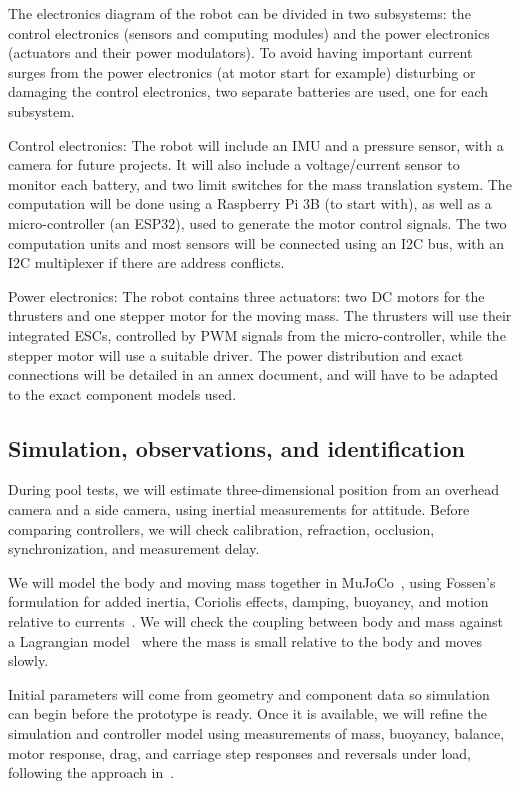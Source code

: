 \documentclass[letterpaper, 10 pt, conference]{ieeeconf}
\begin{document}
The electronics diagram of the robot can be divided in two subsystems: the control electronics (sensors and computing modules) and the power electronics (actuators and their power modulators). To avoid having important current surges from the power electronics (at motor start for example) disturbing or damaging the control electronics, two separate batteries are used, one for each subsystem.

Control electronics: The robot will include an IMU and a pressure sensor, with a camera for future projects. It will also include a voltage/current sensor to monitor each battery, and two limit switches for the mass translation system. The computation will be done using a Raspberry Pi 3B (to start with), as well as a micro-controller (an ESP32), used to generate the motor control signals. The two computation units and most sensors will be connected using an I2C bus, with an I2C multiplexer if there are address conflicts.

Power electronics: The robot contains three actuators: two DC motors for the thrusters and one stepper motor for the moving mass. The thrusters will use their integrated ESCs, controlled by PWM signals from the micro-controller, while the stepper motor will use a suitable driver.
The power distribution and exact connections will be detailed in an annex document, and will have to be adapted to the exact component models used.

\subsection{Simulation, observations, and identification}

During pool tests, we will estimate three-dimensional position from an overhead camera and a side camera, using inertial measurements for attitude. Before comparing controllers, we will check calibration, refraction, occlusion, synchronization, and measurement delay.

We will model the body and moving mass together in MuJoCo~\cite{todorov}, using Fossen's formulation for added inertia, Coriolis effects, damping, buoyancy, and motion relative to currents~\cite{fossen}. We will check the coupling between body and mass against a Lagrangian model~\cite{rambech} where the mass is small relative to the body and moves slowly.

Initial parameters will come from geometry and component data so simulation can begin before the prototype is ready. Once it is available, we will refine the simulation and controller model using measurements of mass, buoyancy, balance, motor response, drag, and carriage step responses and reversals under load, following the approach in~\cite{benzon}.
\end{document}
